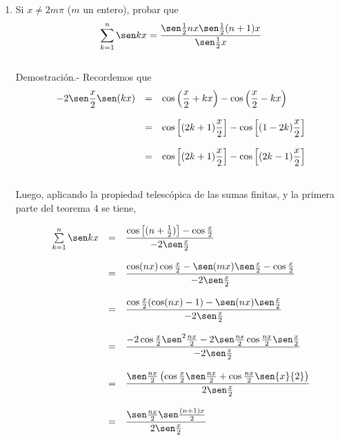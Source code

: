 \begin{enumerate}
\item Si $x\neq 2m\pi$ ($m$ un entero), probar que 
    $$\sum\limits_{k=1}^n \sen kx = \dfrac{\sen\frac{1}{2} nx \sen\frac{1}{2}(n+1)x}{\sen\frac{1}{2}x}$$\\
    Demostración.-\; Recordemos que 
    $$\begin{array}{rcl}
    -2\sen\dfrac{x}{2}\sen(kx)&=&\cos\left(\dfrac{x}{2}+kx\right) - \cos\left(\dfrac{x}{2}-kx\right)\\\\
			      &=&\cos\left[(2k+1)\dfrac{x}{2}\right]-\cos\left[(1-2k)\dfrac{x}{2}\right]\\\\
			      &=&\cos \left[(2k+1)\dfrac{x}{2}\right]-\cos\left[(2k-1)\dfrac{x}{2}\right]\\\\
    \end{array}$$
    
    Luego, aplicando la propiedad telescópica de las sumas finitas, y la primera parte del teorema 4 se tiene,

    $$\begin{array}{rcl}
	\sum\limits_{k=1}^n \sen kx&=&\dfrac{\cos \left[(n+\frac{1}{2})\right]-\cos \frac{x}{2}}{-2\sen \frac{x}{2}}\\\\
				   &=&\dfrac{\cos(nx)\cos \frac{x}{2}-\sen(mx)\sen \frac{x}{2}-\cos \frac{x}{2}}{-2\sen \frac{x}{2}}\\\\
				   &=&\dfrac{\cos\frac{x}{2}(\cos(nx)-1)-\sen (nx) \sen \frac{x}{2}}{-2\sen \frac{x}{2}}\\\\
				   &=&\dfrac{-2\cos \frac{x}{2}\sen^2 \frac{nx}{2} - 2\sen \frac{ns}{2} \cos \frac{nx}{2} \sen \frac{x}{2}}{-2\sen \frac{x}{2}}\\\\
				   &=&\dfrac{\sen \frac{nx}{2}\left(\cos \frac{x}{2} \sen \frac{nx}{2} + \cos \frac{nx}{2} \sen{x}{2}\right)}{2\sen \frac{x}{2}}\\\\
				   &=&\dfrac{\sen \frac{nx}{2} \sen \frac{(n+1)x}{2}}{2\sen \frac{x}{2}}\\\\
    \end{array}$$


\end{enumerate}
